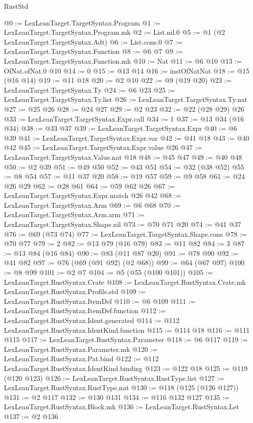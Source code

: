 \begin{lexlean}{RustStd}
\begin{coremodule}
@0 := LexLeanTarget.TargetSyntax.Program
@1 := LexLeanTarget.TargetSyntax.Program.mk
@2 := List.nil.{0}
@5 := @1 (@2 LexLeanTarget.TargetSyntax.Adt)
@6 := List.cons.{0}
@7 := LexLeanTarget.TargetSyntax.Function
@8 := @6 @7
@9 := LexLeanTarget.TargetSyntax.Function.mk
@10 := Nat
@11 := @6 @10
@13 := OfNat.ofNat.{0} @10
@14 := 0
@15 := @13 @14
@16 := instOfNatNat
@18 := @15 (@16 @14)
@19 := @11 @18
@20 := @2 @10
@22 := @9 (@19 @20)
@23 := LexLeanTarget.TargetSyntax.Ty
@24 := @6 @23
@25 := LexLeanTarget.TargetSyntax.Ty.list
@26 := LexLeanTarget.TargetSyntax.Ty.nat
@27 := @25 @26
@28 := @24 @27
@29 := @2 @23
@32 := @22 (@28 @29) @26
@33 := LexLeanTarget.TargetSyntax.Expr.call
@34 := 1
@37 := @13 @34 (@16 @34)
@38 := @33 @37
@39 := LexLeanTarget.TargetSyntax.Expr
@40 := @6 @39
@41 := LexLeanTarget.TargetSyntax.Expr.var
@42 := @41 @18
@43 := @40 @42
@45 := LexLeanTarget.TargetSyntax.Expr.value @26
@47 := LexLeanTarget.TargetSyntax.Value.nat @18
@48 := @45 @47
@49 := @40 @48
@50 := @2 @39
@51 := @49 @50
@52 := @43 @51
@54 := @32 (@38 @52)
@55 := @8 @54
@57 := @11 @37 @20
@58 := @19 @57
@59 := @9 @58
@61 := @24 @26 @29
@62 := @28 @61
@64 := @59 @62 @26
@67 := LexLeanTarget.TargetSyntax.Expr.match @26 @42
@68 := LexLeanTarget.TargetSyntax.Arm
@69 := @6 @68
@70 := LexLeanTarget.TargetSyntax.Arm.arm
@71 := LexLeanTarget.TargetSyntax.Shape.nil
@73 := @70 @71 @20
@74 := @41 @37
@76 := @69 (@73 @74)
@77 := LexLeanTarget.TargetSyntax.Shape.cons
@78 := @70 @77
@79 := 2
@82 := @13 @79 (@16 @79)
@83 := @11 @82
@84 := 3
@87 := @13 @84 (@16 @84)
@90 := @83 (@11 @87 @20)
@91 := @78 @90
@92 := @41 @82
@97 := @76 (@69 (@91 @92) (@2 @68))
@99 := @64 (@67 @97)
@100 := @8 @99
@101 := @2 @7
@104 := @5 (@55 (@100 @101))
@105 := LexLeanTarget.RustSyntax.Crate
@108 := LexLeanTarget.RustSyntax.Crate.mk LexLeanTarget.RustSyntax.Profile.std
@109 := LexLeanTarget.RustSyntax.ItemDef
@110 := @6 @109
@111 := LexLeanTarget.RustSyntax.ItemDef.function
@112 := LexLeanTarget.RustSyntax.Ident.generated
@114 := @112 LexLeanTarget.RustSyntax.IdentKind.function
@115 := @114 @18
@116 := @111 @115
@117 := LexLeanTarget.RustSyntax.Parameter
@118 := @6 @117
@119 := LexLeanTarget.RustSyntax.Parameter.mk
@120 := LexLeanTarget.RustSyntax.Pat.bind
@122 := @112 LexLeanTarget.RustSyntax.IdentKind.binding
@123 := @122 @18
@125 := @119 (@120 @123)
@126 := LexLeanTarget.RustSyntax.RustType.list
@127 := LexLeanTarget.RustSyntax.RustType.nat
@130 := @118 (@125 (@126 @127))
@131 := @2 @117
@132 := @130 @131
@134 := @116 @132 @127
@135 := LexLeanTarget.RustSyntax.Block.mk
@136 := LexLeanTarget.RustSyntax.Let
@137 := @2 @136

\end{coremodule}
\end{lexlean}
